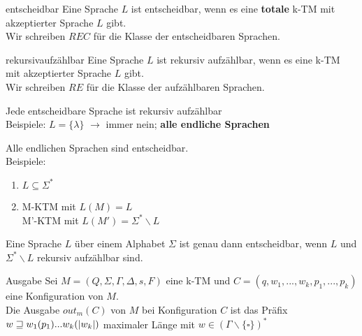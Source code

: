 \begin{defn}{entscheidbar}
    Eine Sprache $L$ ist entscheidbar, wenn es eine \textbf{totale} k-TM mit akzeptierter Sprache $L$ gibt.\\
    Wir schreiben $REC$ für die Klasse der entscheidbaren Sprachen. 
\end{defn}

\begin{defn}{rekursivaufzählbar}
    Eine Sprache $L$ ist rekursiv aufzählbar, wenn es eine k-TM mit akzeptierter Sprache $L$ gibt. \\
    Wir schreiben $RE$ für die Klasse der aufzählbaren Sprachen.
\end{defn}

\begin{bem}
    Jede entscheidbare Sprache ist rekursiv aufzählbar\\
    Beispiele: $L=\{\lambda\}$ $\rightarrow$ immer nein; \textbf{alle endliche Sprachen}\\
\end{bem}

\begin{bem}
    Alle endlichen Sprachen sind entscheidbar.\\
    Beispiele:
    \begin{enumerate}
        \item $L \subseteq \Sigma^*$
        \item M-KTM mit $L(M)=L$ \\
              M'-KTM mit $L(M') = \Sigma^* \backslash L$
    \end{enumerate}
\end{bem}

\begin{bem}
    Eine Sprache $L$ über einem Alphabet $\Sigma$ ist genau dann entscheidbar, wenn $L$ und $\Sigma^*\backslash L$ rekursiv aufzählbar sind.
\end{bem}

\begin{defn}{Ausgabe}
    Sei $M = (Q, \Sigma, \Gamma, \Delta, s, F)$ eine k-TM und $C=(q,w_1,...,w_k,p_1,...,p_k)$ eine Konfiguration von $M$. \\

    Die Ausgabe $out_m(C)$ von $M$ bei Konfiguration $C$ ist das Präfix $w \sqsupseteq w_1(p_1)...w_k(|w_k|)$ maximaler Länge mit $w \in (\Gamma \backslash \{\square\})^*$
\end{defn}

